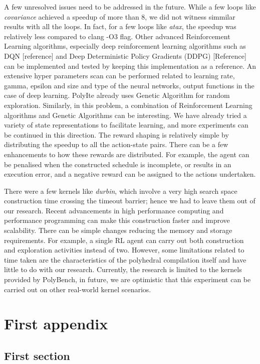 \documentclass[logo,msc]{infthesis}           %
\begin{document}
A few unresolved issues need to be addressed in the future. While a few loops like \textit{covariance} achieved a speedup of more than 8, we did not witness simmilar results with all the loops. In fact, for a few loops like \textit{atax}, the speedup was relatively less compared to clang -O3 flag. Other advanced Reinforcement Learning algorithms, especially deep reinforcement learning algorithms such as DQN [reference] and Deep Deterministic Policy Gradients (DDPG) [Reference] can be implemented and tested by keeping this implementation as a reference. An extensive hyper parameters scan can be performed related to learning rate, gamma, epsilon and size and type of the neural networks, output functions in the case of deep learning. PolyIte already uses Genetic Algorithm for random exploration. Similarly, in this problem, a combination of Reinforcement Learning algorithms and Genetic Algorithms can be interesting. We have already tried a variety of state representations to facilitate learning, and more experiments can be continued in this direction. The reward shaping is relatively simple by distributing the speedup to all the action-state pairs. There can be a few enhancements to how these rewards are distributed. For example, the agent can be penalised when the constructed schedule is incomplete, or results in an execution error, and a negative reward can be assigned to the actions undertaken.

There were a few kernels like \textit{durbin}, which involve a very high search space construction time crossing the timeout barrier; hence we had to leave them out of our research. Recent advancements in high performance computing and performance programming can make this construction faster and improve scalability. There can be simple changes reducing the memory and storage requirements. For example, a single RL agent can carry out both construction and exploration activities instead of two. However, some limitations related to time taken are the characteristics of the polyhedral compilation itself and have little to do with our research. Currently, the research is limited to the kernels provided by PolyBench, in future, we are optimistic that this experiment can be carried out on other real-world kernel scenarios.







\appendix

\chapter{First appendix}

\section{First section}
\end{document}
